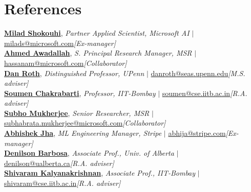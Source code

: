 \section{\mysidestyle References}
\vspace{0mm}
\textbf{\textsf{\href{https://www.microsoft.com/en-us/research/people/milads/}{Milad Shokouhi}}}, \textit{Partner Applied Scientist, Microsoft AI} $|$ \href{mailto:milads@microsoft.com}{milads@microsoft.com}\hfill{\textit{[Ex-manager]}}
\\
\textbf{\textsf{\href{https://www.microsoft.com/en-us/research/people/hassanam/}{Ahmed Awadallah}}}, \textit{S. Principal Research Manager, MSR} $|$ \href{mailto:hassanam@microsoft.com}{hassanam@microsoft.com}\hfill{\textit{[Collaborator]}}
\\
\textbf{\textsf{\href{http://www.cis.upenn.edu/~danroth/}{Dan Roth}}}, \textit{Distinguished Professor, UPenn} $|$ \href{mailto:danroth@seas.upenn.edu}{danroth@seas.upenn.edu}\hfill{\textit{[M.S. adviser]}}
\\
\textbf{\textsf{\href{https://www.cse.iitb.ac.in/~soumen/}{Soumen Chakrabarti}}}, \textit{Professor, IIT-Bombay} $|$ \href{mailto:soumen@cse.iitb.ac.in}{soumen@cse.iitb.ac.in}\hfill{\textit{[R.A. adviser]}}
\\
\textbf{\textsf{\href{https://www.microsoft.com/en-us/research/people/submukhe/}{Subho Mukherjee}}}, \textit{Senior Researcher, MSR} $|$ \href{mailto:subhabrata.mukherjee@microsoft.com}{subhabrata.mukherjee@microsoft.com}\hfill{\textit{[Collaborator]}}
\\
\textbf{\textsf{\href{https://www.linkedin.com/in/abhishek-jha-35510036/}{Abhishek Jha}}}, \textit{ML Engineering Manager, Stripe} $|$ \href{mailto:abhija@stripe.com}{abhija@stripe.com}\hfill{\textit{[Ex-manager]}}
\\
\textbf{\textsf{\href{https://sites.ualberta.ca/~denilson/}{Denilson Barbosa}}}, \textit{Associate Prof., Univ. of Alberta} $|$ \href{mailto:denilson@ualberta.ca}{denilson@ualberta.ca}\hfill{\textit{[R.A. adviser]}}
\\
\textbf{\textsf{\href{https://www.cse.iitb.ac.in/~shivaram/}{Shivaram Kalyanakrishnan}}}, \textit{Associate Prof., IIT-Bombay} $|$ \href{mailto:shivaram@cse.iitb.ac.in}{shivaram@cse.iitb.ac.in}\hfill{\textit{[R.A. adviser]}}